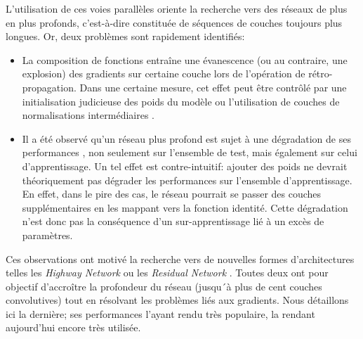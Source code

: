 L'utilisation de ces voies parallèles oriente la recherche vers des réseaux de plus en plus profonds, c'est-à-dire constituée de séquences de couches toujours plus longues. Or, deux problèmes sont rapidement identifiés:
\begin{itemize}
	\item La composition de fonctions entraîne une évanescence (ou au contraire, une explosion) des gradients sur certaine couche lors de l'opération de rétro-propagation. Dans une certaine mesure, cet effet peut être contrôlé par une initialisation judicieuse des poids du modèle\cite{glorotUnderstandingDifficultyTraining2010, heDelvingDeepRectifiers2015} ou l'utilisation de couches de normalisations intermédiaires \cite{ioffeBatchNormalizationAccelerating2015, ulyanovInstanceNormalizationMissing2016a, baLayerNormalization2016}.
	\item Il a été observé qu'un réseau plus profond est sujet à une dégradation de ses performances \cite{heConvolutionalNeuralNetworks2015a, srivastavaHighwayNetworks2015}, non seulement sur l'ensemble de test, mais également sur celui d'apprentissage. Un tel effet est contre-intuitif: ajouter des poids ne devrait théoriquement pas dégrader les performances sur l'ensemble d'apprentissage. En effet, dans le pire des cas, le réseau pourrait se passer des couches supplémentaires en les mappant vers la fonction identité. Cette dégradation n'est donc pas la conséquence d'un sur-apprentissage lié à un excès de paramètres.
\end{itemize}
Ces observations ont motivé la recherche vers de nouvelles formes d'architectures telles les \textit{Highway Network} \cite{srivastavaHighwayNetworks2015} ou les \textit{Residual Network} \cite{heDeepResidualLearning2016b}. Toutes deux ont pour objectif d'accroître la profondeur du réseau (jusqu´à plus de cent couches convolutives) tout en résolvant les problèmes liés aux gradients. Nous détaillons ici la dernière; ses performances l'ayant rendu très populaire, la rendant aujourd'hui encore très utilisée.

